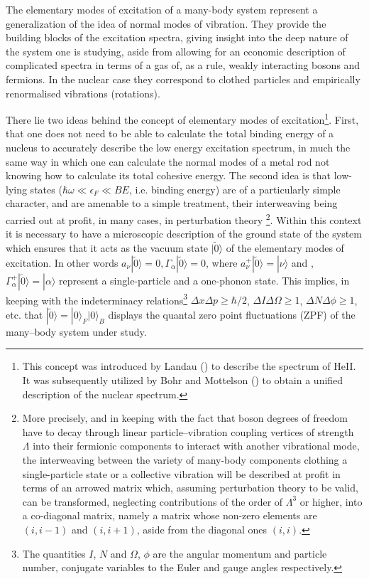 The elementary modes of excitation  of a many-body system  represent a generalization of  the idea of normal modes of vibration.
They provide the building blocks of the excitation spectra, giving  insight  into the  deep nature  of the system one is studying, aside from allowing 
for an economic description  of complicated spectra in terms of a gas of, as a rule, weakly interacting bosons and fermions. In the nuclear case 
they correspond to clothed particles and empirically renormalised vibrations (rotations).

There lie two ideas behind the concept of elementary modes of excitation\footnote{This concept was introduced by Landau (\cite{Landau:41}) to describe the spectrum of HeII. It was subsequently utilized by Bohr and Mottelson (\cite{Bohr:75}) to obtain a unified description of the nuclear spectrum.}. First, that one does not need to be able to calculate the total binding
energy  of a nucleus to accurately describe the low energy excitation spectrum, in much the same way in which one can calculate 
the normal modes of a metal rod not knowing how to  calculate its total cohesive energy.
The second idea is that low-lying states ($\hbar \omega \ll \epsilon_F \ll BE$, i.e. binding energy) are of a particularly simple
character, and are amenable to a simple treatment, their
interweaving  being carried out at profit, in many cases,  in perturbation theory
\footnote{More precisely, and in keeping with  the fact that 
boson degrees of freedom have to decay through linear particle--vibration 
coupling vertices of strength $\Lambda$ into their fermionic components to interact with another vibrational mode,
the interweaving between the variety of many-body components clothing a single-particle state 
or a collective vibration will be described at profit in terms of an arrowed matrix which, assuming perturbation theory
to be valid, can be transformed, neglecting contributions of the order of $\Lambda^3$ or higher, into a co-diagonal matrix, namely a matrix 
whose non-zero elements are $(i,i-1)$ and $(i,i+1)$,  aside from  the diagonal ones $(i,i)$.}. 
Within this context it is  necessary to have a microscopic description 
of the ground  state of the system  which ensures that it acts as the vacuum state 
$|\tilde0\rangle  $ of the elementary modes of excitation. In other words $a_{\nu}|\tilde 0 \rangle   = 0, \Gamma_{\alpha} |\tilde 0\rangle   =0$, where
$a^+_{\nu}|\tilde 0 \rangle   = |\nu\rangle  $ and , $\Gamma^+_{\alpha} |\tilde 0\rangle   =|\alpha\rangle  $ represent a single-particle and a one-phonon state.
This   implies, in keeping 
with the indeterminacy  relations\footnote{The quantities $I$, $N$ and $\Omega$, $\phi$ are the angular momentum and particle number, conjugate variables to the Euler and gauge angles respectively.} $\Delta x \Delta p \geq \hbar/2$, $\Delta I \Delta \Omega \geq 1$, $\Delta N \Delta \phi \geq 1$, etc.  that $|\tilde 0\rangle   = |0\rangle  _F |0\rangle  _B$
displays the  quantal zero point fluctuations (ZPF) of the many--body system under study.

